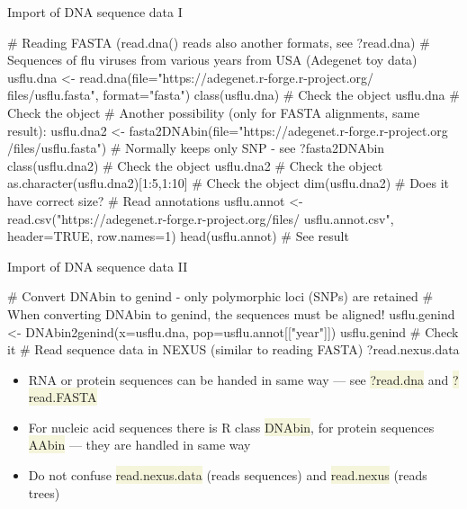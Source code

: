 \documentclass[compress, xelatex, 11pt, xcolor=svgnames, aspectratio=169, url={hyphens, lowtilde}]{beamer}
\renewcommand{\texttt}[1]{\colorbox{Beige}{{\ttfamily #1}}}
\begin{document}
\begin{frame}[fragile]{Import of DNA sequence data I}
	\begin{spluscode}
    # Reading FASTA (read.dna() reads also another formats, see ?read.dna)
    # Sequences of flu viruses from various years from USA (Adegenet toy data)
    usflu.dna <- read.dna(file="https://adegenet.r-forge.r-project.org/
      files/usflu.fasta", format="fasta")
    class(usflu.dna) # Check the object
    usflu.dna # Check the object
    # Another possibility (only for FASTA alignments, same result):
    usflu.dna2 <- fasta2DNAbin(file="https://adegenet.r-forge.r-project.org
      /files/usflu.fasta") # Normally keeps only SNP - see ?fasta2DNAbin
    class(usflu.dna2) # Check the object
    usflu.dna2 # Check the object
    as.character(usflu.dna2)[1:5,1:10] # Check the object
    dim(usflu.dna2) # Does it have correct size?
    # Read annotations
    usflu.annot <- read.csv("https://adegenet.r-forge.r-project.org/files/
      usflu.annot.csv", header=TRUE, row.names=1)
    head(usflu.annot) # See result
	\end{spluscode}
\end{frame}

\begin{frame}[fragile]{Import of DNA sequence data II}
	\begin{spluscode}
    # Convert DNAbin to genind - only polymorphic loci (SNPs) are retained
    # When converting DNAbin to genind, the sequences must be aligned!
    usflu.genind <- DNAbin2genind(x=usflu.dna, pop=usflu.annot[["year"]])
    usflu.genind # Check it
    # Read sequence data in NEXUS (similar to reading FASTA)
    ?read.nexus.data
	\end{spluscode}
	\begin{itemize}
		\item RNA or protein sequences can be handed in same way --- see \texttt{?read.dna} and \texttt{?read.FASTA}
		\item For nucleic acid sequences there is R class \texttt{DNAbin}, for protein sequences \texttt{AAbin} --- they are handled in same way
		\item Do not confuse \texttt{read.nexus.data} (reads sequences) and \texttt{read.nexus} (reads trees)
	\end{itemize}
\end{frame}
\end{document}
